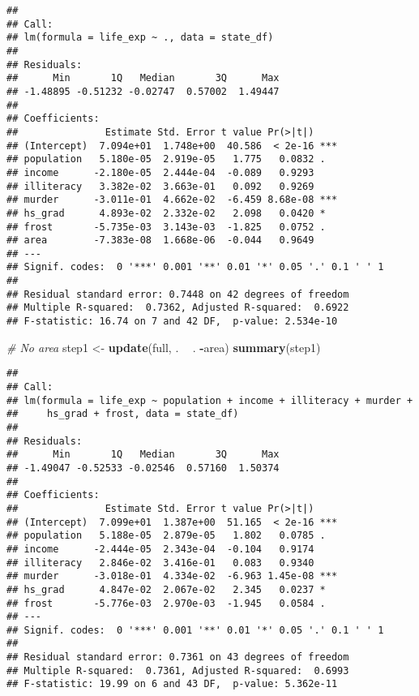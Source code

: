 \documentclass[]{article}
\newenvironment{Shaded}{\begin{snugshade}}{\end{snugshade}}
\newcommand{\CommentTok}[1]{\textcolor[rgb]{0.56,0.35,0.01}{\textit{#1}}}
\newcommand{\KeywordTok}[1]{\textcolor[rgb]{0.13,0.29,0.53}{\textbf{#1}}}
\newcommand{\NormalTok}[1]{#1}
\newcommand{\OperatorTok}[1]{\textcolor[rgb]{0.81,0.36,0.00}{\textbf{#1}}}
\newcommand{\StringTok}[1]{\textcolor[rgb]{0.31,0.60,0.02}{#1}}
\begin{document}
\begin{verbatim}
## 
## Call:
## lm(formula = life_exp ~ ., data = state_df)
## 
## Residuals:
##      Min       1Q   Median       3Q      Max 
## -1.48895 -0.51232 -0.02747  0.57002  1.49447 
## 
## Coefficients:
##               Estimate Std. Error t value Pr(>|t|)    
## (Intercept)  7.094e+01  1.748e+00  40.586  < 2e-16 ***
## population   5.180e-05  2.919e-05   1.775   0.0832 .  
## income      -2.180e-05  2.444e-04  -0.089   0.9293    
## illiteracy   3.382e-02  3.663e-01   0.092   0.9269    
## murder      -3.011e-01  4.662e-02  -6.459 8.68e-08 ***
## hs_grad      4.893e-02  2.332e-02   2.098   0.0420 *  
## frost       -5.735e-03  3.143e-03  -1.825   0.0752 .  
## area        -7.383e-08  1.668e-06  -0.044   0.9649    
## ---
## Signif. codes:  0 '***' 0.001 '**' 0.01 '*' 0.05 '.' 0.1 ' ' 1
## 
## Residual standard error: 0.7448 on 42 degrees of freedom
## Multiple R-squared:  0.7362, Adjusted R-squared:  0.6922 
## F-statistic: 16.74 on 7 and 42 DF,  p-value: 2.534e-10
\end{verbatim}

\begin{Shaded}
\begin{Highlighting}[]
\CommentTok{# No area}
\NormalTok{step1 <-}\StringTok{ }\KeywordTok{update}\NormalTok{(full, . }\OperatorTok{~}\StringTok{ }\NormalTok{. }\OperatorTok{-}\NormalTok{area)}
\KeywordTok{summary}\NormalTok{(step1)}
\end{Highlighting}
\end{Shaded}

\begin{verbatim}
## 
## Call:
## lm(formula = life_exp ~ population + income + illiteracy + murder + 
##     hs_grad + frost, data = state_df)
## 
## Residuals:
##      Min       1Q   Median       3Q      Max 
## -1.49047 -0.52533 -0.02546  0.57160  1.50374 
## 
## Coefficients:
##               Estimate Std. Error t value Pr(>|t|)    
## (Intercept)  7.099e+01  1.387e+00  51.165  < 2e-16 ***
## population   5.188e-05  2.879e-05   1.802   0.0785 .  
## income      -2.444e-05  2.343e-04  -0.104   0.9174    
## illiteracy   2.846e-02  3.416e-01   0.083   0.9340    
## murder      -3.018e-01  4.334e-02  -6.963 1.45e-08 ***
## hs_grad      4.847e-02  2.067e-02   2.345   0.0237 *  
## frost       -5.776e-03  2.970e-03  -1.945   0.0584 .  
## ---
## Signif. codes:  0 '***' 0.001 '**' 0.01 '*' 0.05 '.' 0.1 ' ' 1
## 
## Residual standard error: 0.7361 on 43 degrees of freedom
## Multiple R-squared:  0.7361, Adjusted R-squared:  0.6993 
## F-statistic: 19.99 on 6 and 43 DF,  p-value: 5.362e-11
\end{verbatim}
\end{document}
